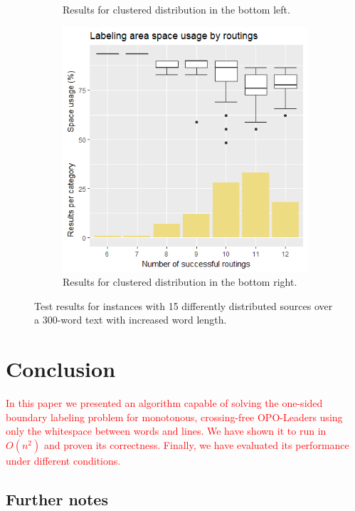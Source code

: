 \documentclass[11pt,a4paper]{vutinfth}
\newcommand{\change}[1]{\textcolor{red}{#1}}
\begin{document}
\begin{figure}
\begin{subfigure}[b]{\textwidth}
		\caption{\label{fig:15blLong}Results for clustered distribution in the bottom left.}
	\end{subfigure}
	\begin{subfigure}[b]{\textwidth}
		\centering
		\includegraphics[scale=0.6]{Rplot_15br_longer.png}
		\caption{\label{fig:15brLong}Results for clustered distribution in the bottom right.}
	\end{subfigure}
	\caption{Test results for instances with 15 differently distributed sources over a 300-word text with increased word length.}
	\label{fig:longTests}
\end{figure}


\chapter{Conclusion}

\change{In this paper we presented an algorithm capable of solving the one-sided boundary labeling problem for monotonous, crossing-free OPO-Leaders using only the whitespace between words and lines. We have shown it to run in $O(n^2)$ and proven its correctness. Finally, we have evaluated its performance under different conditions.}

\section{Further notes}
\end{document}
